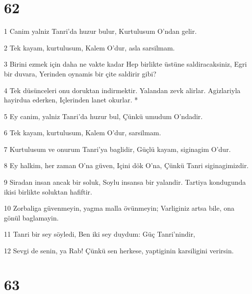 \chapter{62}

\par 1 Canim yalniz Tanri'da huzur bulur, Kurtulusum O'ndan gelir.
\par 2 Tek kayam, kurtulusum, Kalem O'dur, asla sarsilmam.
\par 3 Birini ezmek için daha ne vakte kadar Hep birlikte üstüne saldiracaksiniz, Egri bir duvara, Yerinden oynamis bir çite saldirir gibi?
\par 4 Tek düsünceleri onu doruktan indirmektir. Yalandan zevk alirlar. Agizlariyla hayirdua ederken, Içlerinden lanet okurlar. *
\par 5 Ey canim, yalniz Tanri'da huzur bul, Çünkü umudum O'ndadir.
\par 6 Tek kayam, kurtulusum, Kalem O'dur, sarsilmam.
\par 7 Kurtulusum ve onurum Tanri'ya baglidir, Güçlü kayam, siginagim O'dur.
\par 8 Ey halkim, her zaman O'na güven, Içini dök O'na, Çünkü Tanri siginagimizdir.
\par 9 Siradan insan ancak bir soluk, Soylu insansa bir yalandir. Tartiya kondugunda ikisi birlikte soluktan hafiftir.
\par 10 Zorbaliga güvenmeyin, yagma malla övünmeyin; Varliginiz artsa bile, ona gönül baglamayin.
\par 11 Tanri bir sey söyledi, Ben iki sey duydum: Güç Tanri'nindir,
\par 12 Sevgi de senin, ya Rab! Çünkü sen herkese, yaptiginin karsiligini verirsin.

\chapter{63}

